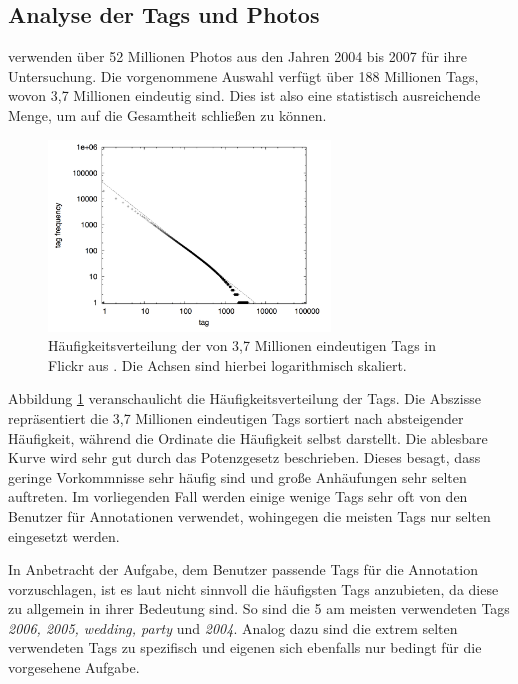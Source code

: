 \subsection{Analyse der Tags und Photos} %
\label{sub:analyse_der_tags}

\cite{collectiveKnowledge} verwenden über 52 Millionen Photos aus den Jahren 2004 bis 2007 für ihre Untersuchung. Die vorgenommene Auswahl verfügt über 188 Millionen Tags, wovon 3,7 Millionen eindeutig sind. Dies ist also eine statistisch ausreichende Menge, um auf die Gesamtheit schließen zu können.

\begin{figure}[htbp]
    \centering
      \includegraphics[height=2in]{images/collectiveKnowledge_tag_frequency.png}
    \caption{Häufigkeitsverteilung der von 3,7 Millionen eindeutigen Tags in Flickr aus \cite{collectiveKnowledge}. Die Achsen sind hierbei logarithmisch skaliert.}
    \label{fig:images_collectiveKnowledge_word_net_categories}
\end{figure}

Abbildung \ref{fig:images_collectiveKnowledge_word_net_categories} veranschaulicht die Häufigkeitsverteilung der Tags. Die Abszisse repräsentiert die 3,7 Millionen eindeutigen Tags sortiert nach absteigender Häufigkeit, während die Ordinate die Häufigkeit selbst darstellt. Die ablesbare Kurve wird sehr gut durch das Potenzgesetz  beschrieben. Dieses besagt, dass geringe Vorkommnisse sehr häufig sind und große Anhäufungen sehr selten auftreten. Im vorliegenden Fall werden einige wenige Tags sehr oft von den Benutzer für Annotationen verwendet, wohingegen die meisten Tags nur selten eingesetzt werden.

In Anbetracht der Aufgabe, dem Benutzer passende Tags für die Annotation vorzuschlagen, ist es laut \cite{collectiveKnowledge} nicht sinnvoll die häufigsten Tags anzubieten, da diese zu allgemein in ihrer Bedeutung sind. So sind die 5 am meisten verwendeten Tags \emph{2006, 2005, wedding, party} und \emph{2004}. Analog dazu sind die extrem selten verwendeten Tags zu spezifisch und eigenen sich ebenfalls nur bedingt für die vorgesehene Aufgabe.

